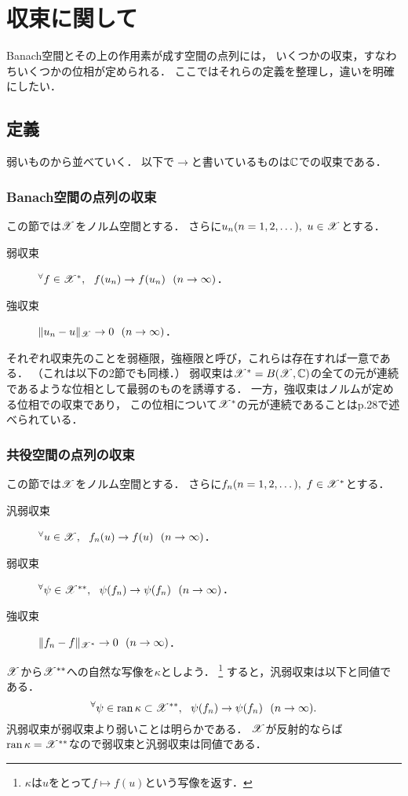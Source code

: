 \section{収束に関して}
    Banach空間とその上の作用素が成す空間の点列には，
    いくつかの収束，すなわちいくつかの位相が定められる．
    ここではそれらの定義を整理し，違いを明確にしたい．
    \subsection{定義}
    弱いものから並べていく．
    以下で$\to$と書いているものは$\mathbb{C}$での収束である．
    \newpage
    \subsubsection{Banach空間の点列の収束}
    この節では$\mathscr{X}$をノルム空間とする．
    さらに$u_n (n=1,2,\dots),~ u \in \mathscr{X}$とする．
    \begin{description}
        \item[弱収束] ${}^{\forall} f \in \mathscr{X}^*,~~ f(u_n) \to f(u_n) ~~ (n \to \infty)$．
        \item[強収束] $\|u_n-u\|_{\mathscr{X}} \to 0 ~~ (n \to \infty)$．
    \end{description}
    それぞれ収束先のことを弱極限，強極限と呼び，これらは存在すれば一意である．
    （これは以下の2節でも同様．）
    弱収束は$\mathscr{X}^*=B(\mathscr{X},\mathbb{C})$の全ての元が連続であるような位相として最弱のものを誘導する．
    一方，強収束はノルムが定める位相での収束であり，
    この位相について$\mathscr{X}^*$の元が連続であることはp.28で述べられている．

    \subsubsection{共役空間の点列の収束}
    この節では$\mathscr{X}$をノルム空間とする．
    さらに$f_n (n=1,2,\dots),~ f \in \mathscr{X}^*$とする．
    \begin{description}
        \item[汎弱収束] ${}^{\forall} u \in \mathscr{X},~~ f_n(u) \to f(u) ~~ (n \to \infty)$．
        \item[弱収束]\hspace{0.6em} ${}^{\forall} \psi \in \mathscr{X}^{**},~~ \psi(f_n) \to \psi(f_n) ~~ (n \to \infty)$．
        \item[強収束]\hspace{0.6em} $\|f_n-f\|_{\mathscr{X}^*} \to 0 ~~ (n \to \infty)$．
    \end{description}
    $\mathscr{X}$から$\mathscr{X}^{**}$への自然な写像を$\kappa$としよう．
    \footnote{$\kappa$は$u$をとって$f \mapsto f(u)$という写像を返す．}
    すると，汎弱収束は以下と同値である．
    \[ {}^{\forall} \psi \in \operatorname{ran} \kappa \subset \mathscr{X}^{**},~~ \psi(f_n) \to \psi(f_n) ~~ (n \to \infty). \]
    汎弱収束が弱収束より弱いことは明らかである．
    $\mathscr{X}$が反射的ならば$\operatorname{ran} \kappa=\mathscr{X}^{**}$なので弱収束と汎弱収束は同値である．
        
